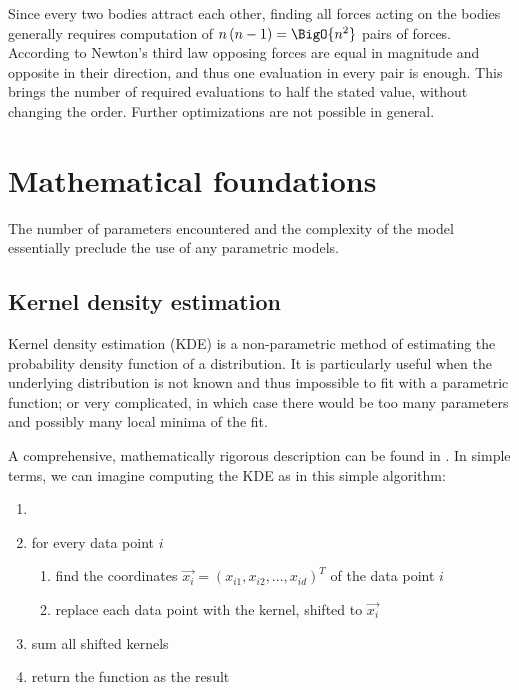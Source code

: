         Since every two bodies attract each other, finding all forces acting on the bodies generally
        requires computation of $n\left(n - 1\right) = \BigO{n^2}$ pairs of forces.
        According to Newton's third law opposing forces are equal in magnitude and opposite in their direction,
        and thus one evaluation in every pair is enough.
        This brings the number of required evaluations to half the stated value, without changing the order.
        Further optimizations are not possible in general.

\section{Mathematical foundations} \label{mm}

    The number of parameters encountered and the complexity of the model essentially preclude the use of any parametric models.

    \subsection{Kernel density estimation} \label{mmk}
        Kernel density estimation (KDE) is a non-parametric method of estimating the probability density function
        of a distribution. It is particularly useful when the underlying distribution is not known and thus impossible
        to fit with a parametric function; or very complicated, in which case there would be too many parameters
        and possibly many local minima of the fit.

        A comprehensive, mathematically rigorous description can be found in \citep{hwang+1994}.
        In simple terms, we can imagine computing the KDE as in this simple algorithm:
        \begin{enumerate}
            \item 
            \item for every data point $i$
                \begin{enumerate}[label=\arabic*.]
                \item find the coordinates $\vec{x_i} = (x_{i1}, x_{i2}, ..., x_{id})^T$ of the data point $i$
                \item replace each data point with the kernel, shifted to $\vec{x_i}$
            \end{enumerate}
            \item sum all shifted kernels
            \item return the function as the result
        \end{enumerate}

